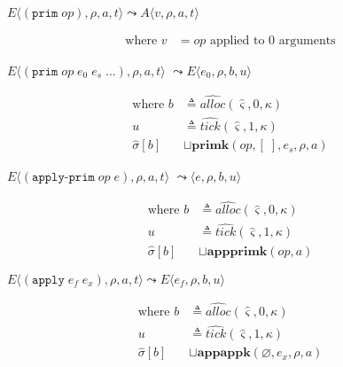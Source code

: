 \documentclass[12pt,draft]{article}
\newcommand{\primsyn}[2]{(\texttt{prim}\;#1\;#2\;...)}
\newcommand{\singleprimsyn}[1]{(\texttt{prim}\;#1)}
\newcommand{\applyprimsyn}[2]{(\texttt{apply-prim}\;#1\;#2)}
\newcommand{\applysyn}[2]{(\texttt{apply}\;#1\;#2)}
\begin{document}
\begin{multicols*}{2}
\begin{center}
  $E\langle \singleprimsyn{op} , \rho , a , t \rangle
  \leadsto
  A\langle v , \rho , a , t \rangle$
\end{center}
\vspace{-7mm}
\begin{align*}
\text{where } v &= op \text{ applied to } 0 \text{ arguments}
\end{align*}
\begin{center}
  $E\langle \primsyn{op}{e_0\;e_s} , \rho , a , t \rangle$
  $\leadsto E\langle e_0 , \rho , b , u \rangle$
\end{center}
\vspace{-7mm}
\begin{align*}
\text{where } b &\triangleq \widehat{alloc}(\hat{\varsigma}, 0, \kappa) \\
u &\triangleq \widehat{tick}(\hat{\varsigma}, 1, \kappa) \\
\hat{\sigma}[b] &\sqcup \textbf{primk}(op, [\;], e_s, \rho, a)
\end{align*}
\begin{center}
  $E\langle \applyprimsyn{op}{e} , \rho , a , t \rangle$
  $\leadsto \langle e , \rho , b , u \rangle$
\end{center}
\vspace{-7mm}
\begin{align*}
\text{where } b &\triangleq \widehat{alloc}(\hat{\varsigma}, 0, \kappa) \\
u &\triangleq \widehat{tick}(\hat{\varsigma}, 1, \kappa) \\
\hat{\sigma}[b] &\sqcup \textbf{appprimk}(op, a)
\end{align*}
\begin{center}
  $E\langle \applysyn{e_f}{e_x} , \rho , a , t \rangle
  \leadsto E\langle e_f , \rho , b , u \rangle$
\end{center}
\vspace{-7mm}
\begin{align*}
\text{where } b &\triangleq \widehat{alloc}(\hat{\varsigma}, 0, \kappa) \\
u &\triangleq \widehat{tick}(\hat{\varsigma}, 1, \kappa) \\
\hat{\sigma}[b] &\sqcup \textbf{appappk}(\varnothing , e_x , \rho, a)

\end{align*}
\end{multicols*}
\end{document}
